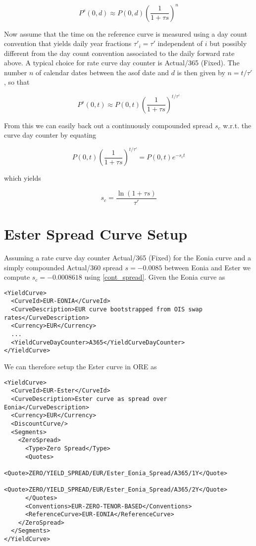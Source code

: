 \documentclass[12pt, a4paper]{article}
\begin{document}
\begin{equation}
  P^s(0,d) \approx P(0,d) \left( \frac{1}{1+\tau s} \right)^n
\end{equation}

Now assume that the time on the reference curve is measured using a day count convention that yields daily year
fractions $\tau'_i = \tau'$ independent of $i$ but possibly different from the day count convention associated to the
daily forward rate above. A typical choice for rate curve day counter is Actual/365 (Fixed). The number $n$ of calendar
dates between the asof date and $d$ is then given by $n = t / \tau'$, so that

\begin{equation}
  P^s(0,t) \approx P(0,t) \left( \frac{1}{1+\tau s} \right)^{t / \tau'}
\end{equation}

From this we can easily back out a continuously compounded spread $s_c$ w.r.t. the curve day counter by equating

\begin{equation}
  P(0,t) \left( \frac{1}{1+\tau s} \right)^{t / \tau'} = P(0,t) e^{-s_c t} 
\end{equation}

which yields

\begin{equation}\label{cont_spread}
 s_c = \frac{\ln (1+\tau s)}{\tau'}
\end{equation}

\section*{Ester Spread Curve Setup}

Assuming a rate curve day counter Actual/365 (Fixed) for the Eonia curve and a simply compounded Actual/360 spread
$s = -0.0085$ between Eonia and Ester we compute $s_c = -0.0008618$ using \ref{cont_spread}. Given the Eonia curve as

\begin{verbatim}
<YieldCurve>
  <CurveId>EUR-EONIA</CurveId>
  <CurveDescription>EUR curve bootstrapped from OIS swap rates</CurveDescription>
  <Currency>EUR</Currency>
  ...
  <YieldCurveDayCounter>A365</YieldCurveDayCounter>
</YieldCurve>
\end{verbatim}

We can therefore setup the Ester curve in ORE as

\begin{verbatim}
<YieldCurve>
  <CurveId>EUR-Ester</CurveId>
  <CurveDescription>Ester curve as spread over Eonia</CurveDescription>
  <Currency>EUR</Currency>
  <DiscountCurve/>
  <Segments>
    <ZeroSpread>
      <Type>Zero Spread</Type>
      <Quotes>
        <Quote>ZERO/YIELD_SPREAD/EUR/Ester_Eonia_Spread/A365/1Y</Quote>
        <Quote>ZERO/YIELD_SPREAD/EUR/Ester_Eonia_Spread/A365/2Y</Quote>
      </Quotes>
      <Conventions>EUR-ZERO-TENOR-BASED</Conventions>
      <ReferenceCurve>EUR-EONIA</ReferenceCurve>
    </ZeroSpread>
  </Segments>
</YieldCurve>
\end{verbatim}
\end{document}
